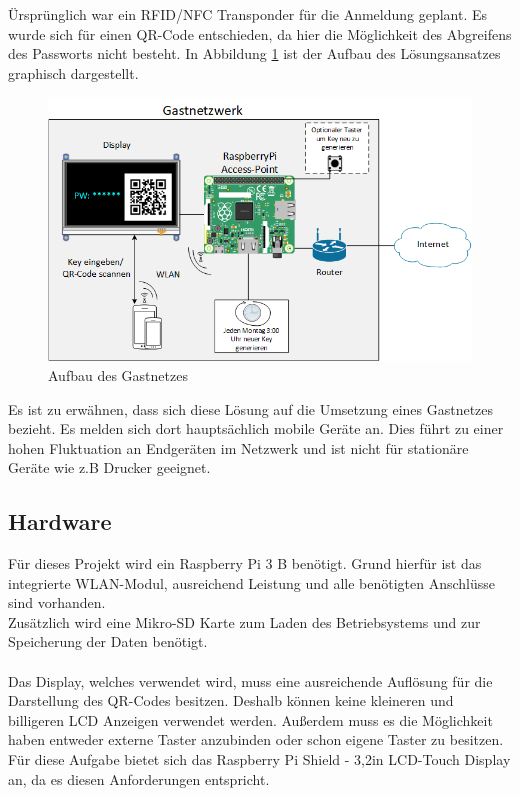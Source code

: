 \documentclass[a4paper,11pt,singlespacing]{article}
\begin{document}
		Ürsprünglich war ein RFID/NFC Transponder für die Anmeldung geplant. Es wurde sich für einen QR-Code entschieden, da hier die Möglichkeit des Abgreifens des Passworts nicht besteht. In Abbildung  \ref{aufbau} ist der Aufbau des Lösungsansatzes graphisch dargestellt. 

		\begin{figure}[ht]
			\centering
			\includegraphics[scale=0.6]{skizze}
				\caption{Aufbau des Gastnetzes}
				\label{aufbau}
		\end{figure}

    	Es ist zu erwähnen, dass sich diese Lösung auf die Umsetzung eines Gastnetzes bezieht. Es melden sich dort hauptsächlich mobile Geräte an. Dies führt zu einer hohen Fluktuation an Endgeräten im Netzwerk und ist nicht für stationäre Geräte wie z.B Drucker geeignet.
    
    
    	\subsection{Hardware}
			Für dieses Projekt wird ein Raspberry Pi 3 B benötigt. Grund hierfür ist das integrierte WLAN-Modul, ausreichend Leistung und alle benötigten Anschlüsse sind vorhanden. \\
			Zusätzlich wird eine Mikro-SD Karte zum Laden des Betriebsystems und zur Speicherung der Daten benötigt. \\ \\
			Das Display, welches verwendet wird, muss eine ausreichende Auflösung für die Darstellung des QR-Codes besitzen. Deshalb können keine kleineren und billigeren LCD Anzeigen verwendet werden. Außerdem muss es die Möglichkeit haben entweder externe Taster anzubinden oder schon eigene Taster zu besitzen. Für diese Aufgabe bietet sich das Raspberry Pi Shield - 3,2in LCD-Touch Display an, da es diesen Anforderungen entspricht.
		
\end{document}
